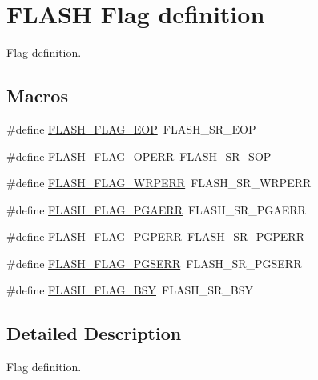 \hypertarget{group___f_l_a_s_h___flag__definition}{}\section{F\+L\+A\+SH Flag definition}
\label{group___f_l_a_s_h___flag__definition}


Flag definition.  


\subsection*{Macros}
\begin{DoxyCompactItemize}
\item 
\#define \mbox{\hyperlink{group___f_l_a_s_h___flag__definition_gaf043ba4d8f837350bfc7754a99fae5a9}{F\+L\+A\+S\+H\+\_\+\+F\+L\+A\+G\+\_\+\+E\+OP}}~F\+L\+A\+S\+H\+\_\+\+S\+R\+\_\+\+E\+OP
\item 
\#define \mbox{\hyperlink{group___f_l_a_s_h___flag__definition_gad8a96ceda91fcf0d1299da933b5816f1}{F\+L\+A\+S\+H\+\_\+\+F\+L\+A\+G\+\_\+\+O\+P\+E\+RR}}~F\+L\+A\+S\+H\+\_\+\+S\+R\+\_\+\+S\+OP
\item 
\#define \mbox{\hyperlink{group___f_l_a_s_h___flag__definition_ga6abf64f916992585899369166db3f266}{F\+L\+A\+S\+H\+\_\+\+F\+L\+A\+G\+\_\+\+W\+R\+P\+E\+RR}}~F\+L\+A\+S\+H\+\_\+\+S\+R\+\_\+\+W\+R\+P\+E\+RR
\item 
\#define \mbox{\hyperlink{group___f_l_a_s_h___flag__definition_ga2c3f4dbea065f8ea2987eada4dab30bd}{F\+L\+A\+S\+H\+\_\+\+F\+L\+A\+G\+\_\+\+P\+G\+A\+E\+RR}}~F\+L\+A\+S\+H\+\_\+\+S\+R\+\_\+\+P\+G\+A\+E\+RR
\item 
\#define \mbox{\hyperlink{group___f_l_a_s_h___flag__definition_ga88a93907641f5eeb4091a26b84c94897}{F\+L\+A\+S\+H\+\_\+\+F\+L\+A\+G\+\_\+\+P\+G\+P\+E\+RR}}~F\+L\+A\+S\+H\+\_\+\+S\+R\+\_\+\+P\+G\+P\+E\+RR
\item 
\#define \mbox{\hyperlink{group___f_l_a_s_h___flag__definition_ga25b80c716320e667162846da8be09b68}{F\+L\+A\+S\+H\+\_\+\+F\+L\+A\+G\+\_\+\+P\+G\+S\+E\+RR}}~F\+L\+A\+S\+H\+\_\+\+S\+R\+\_\+\+P\+G\+S\+E\+RR
\item 
\#define \mbox{\hyperlink{group___f_l_a_s_h___flag__definition_gad3bc368f954ad7744deda3315da2fff7}{F\+L\+A\+S\+H\+\_\+\+F\+L\+A\+G\+\_\+\+B\+SY}}~F\+L\+A\+S\+H\+\_\+\+S\+R\+\_\+\+B\+SY
\end{DoxyCompactItemize}


\subsection{Detailed Description}
Flag definition. 




